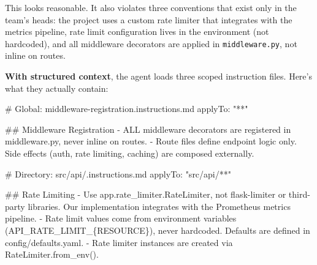 \documentclass[
  a4paper,
  DIV=11,
  numbers=noendperiod]{scrreprt}
\newenvironment{Shaded}{\begin{snugshade}}{\end{snugshade}}
\newcommand{\FunctionTok}[1]{\textcolor[rgb]{0.28,0.35,0.67}{#1}}
\newcommand{\InformationTok}[1]{\textcolor[rgb]{0.37,0.37,0.37}{#1}}
\newcommand{\NormalTok}[1]{\textcolor[rgb]{0.00,0.23,0.31}{#1}}
\newcommand{\SpecialStringTok}[1]{\textcolor[rgb]{0.13,0.47,0.30}{#1}}
\begin{document}
This looks reasonable. It also violates three conventions that exist
only in the team's heads: the project uses a custom rate limiter that
integrates with the metrics pipeline, rate limit configuration lives in
the environment (not hardcoded), and all middleware decorators are
applied in \texttt{middleware.py}, not inline on routes.

\textbf{With structured context}, the agent loads three scoped
instruction files. Here's what they actually contain:

\begin{Shaded}
\begin{Highlighting}[]
\FunctionTok{\# Global: middleware{-}registration.instructions.md}
\NormalTok{applyTo: "**"}

\FunctionTok{\#\# Middleware Registration}
\SpecialStringTok{{-} }\NormalTok{ALL middleware decorators are registered in }\InformationTok{\textasciigrave{}middleware.py\textasciigrave{}}\NormalTok{, never inline on routes.}
\SpecialStringTok{{-} }\NormalTok{Route files define endpoint logic only. Side effects (auth, rate limiting,}
\NormalTok{  caching) are composed externally.}
\end{Highlighting}
\end{Shaded}

\begin{Shaded}
\begin{Highlighting}[]
\FunctionTok{\# Directory: src/api/.instructions.md}
\NormalTok{applyTo: "src/api/**"}

\FunctionTok{\#\# Rate Limiting}
\SpecialStringTok{{-} }\NormalTok{Use }\InformationTok{\textasciigrave{}app.rate\_limiter.RateLimiter\textasciigrave{}}\NormalTok{, not flask{-}limiter or third{-}party libraries.}
\NormalTok{  Our implementation integrates with the Prometheus metrics pipeline.}
\SpecialStringTok{{-} }\NormalTok{Rate limit values come from environment variables (}\InformationTok{\textasciigrave{}API\_RATE\_LIMIT\_\{RESOURCE\}\textasciigrave{}}\NormalTok{),}
\NormalTok{  never hardcoded. Defaults are defined in }\InformationTok{\textasciigrave{}config/defaults.yaml\textasciigrave{}}\NormalTok{.}
\SpecialStringTok{{-} }\NormalTok{Rate limiter instances are created via }\InformationTok{\textasciigrave{}RateLimiter.from\_env()\textasciigrave{}}\NormalTok{.}
\end{Highlighting}
\end{Shaded}
\end{document}
